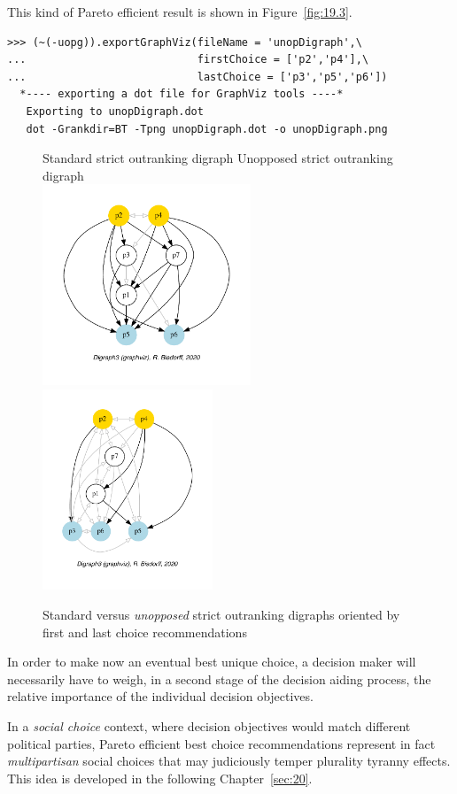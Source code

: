 This kind of Pareto efficient result is shown in Figure~\vref{fig:19.3}.
\begin{lstlisting}
>>> (~(-uopg)).exportGraphViz(fileName = 'unopDigraph',\
...                           firstChoice = ['p2','p4'],\
...                           lastChoice = ['p3','p5','p6'])
  *---- exporting a dot file for GraphViz tools ----*
   Exporting to unopDigraph.dot
   dot -Grankdir=BT -Tpng unopDigraph.dot -o unopDigraph.png
\end{lstlisting}
\begin{figure}[ht]
  Standard strict outranking digraph \hfill Unopposed strict outranking digraph \\
  \includegraphics[height=6cm]{Figures/19-1-stdg.pdf}\hfill
  \includegraphics[height=6cm]{Figures/19-3-unopDigraph.pdf}
\caption{Standard versus \emph{unopposed} strict outranking digraphs oriented by first and last choice recommendations} 
\label{fig:19.3}       %
\end{figure}

In order to make now an eventual best unique choice, a decision maker will necessarily have to weigh, in a second stage of the decision aiding process, the relative importance of the individual decision objectives.

In a \emph{social choice} context, where decision objectives would match different political parties, Pareto efficient best choice recommendations represent in fact \emph{multipartisan} social choices that may judiciously temper plurality tyranny effects. This idea is developed in the following Chapter~\ref{sec:20}.

